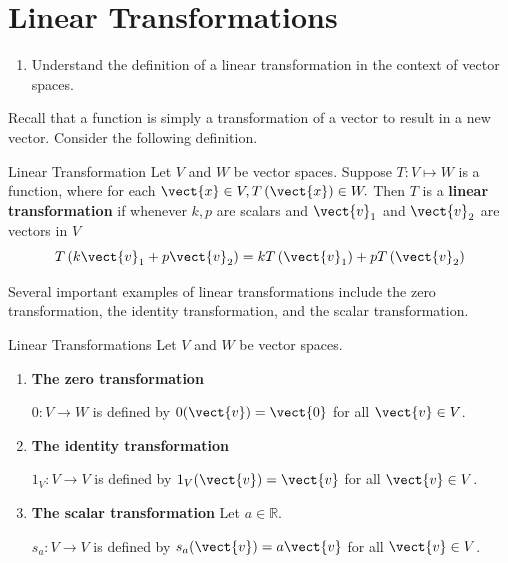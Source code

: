 \section{Linear Transformations}

\begin{outcome}
\begin{enumerate}
\item[A.] Understand the definition of a linear transformation in the context of vector spaces. 
\end{enumerate}
\end{outcome}

Recall that a function is simply a transformation of a vector to result in a new vector. Consider the following definition. 

\begin{definition}{Linear Transformation}\label{def:lineartransformation}
 Let $V$ and $W$ be vector spaces. Suppose $T: V \mapsto W$ is a function, where for each
$\vect{x} \in V ,T\left(\vect{x}\right)\in W.$ Then $T$ is a
 \textbf{linear transformation}
if whenever $k ,p $ are scalars and 
$\vect{v}_1$ and $\vect{v}_2$ are vectors in $V$
\begin{equation*}
T\left( k \vect{v}_1 + p \vect{v}_2 \right) = kT\left(\vect{v}_1\right)+ pT\left(\vect{v}_{2} \right)
\end{equation*}
\end{definition}

Several important examples of linear transformations include the zero transformation, the identity transformation, and the scalar transformation. 

\begin{example}{Linear Transformations}\label{exa:lineartransformations}
Let $V$ and $W$ be vector spaces.

\begin{enumerate}
\item \textbf{The zero transformation} 

$0:V\to W$ is defined by $0(\vect{v})=\vect{0}$ for all $\vect{v}\in V$.

\item \textbf{The identity transformation} 

$1_V:V\to V$ is defined by $1_V(\vect{v})=\vect{v}$ for all $\vect{v}\in V$.

\item \textbf{The scalar transformation} 
Let $a\in\mathbb{R}$.

$s_a:V\to V$ is defined by $s_a(\vect{v})=a\vect{v}$ for all $\vect{v}\in V$.
\end{enumerate}
\end{example}

